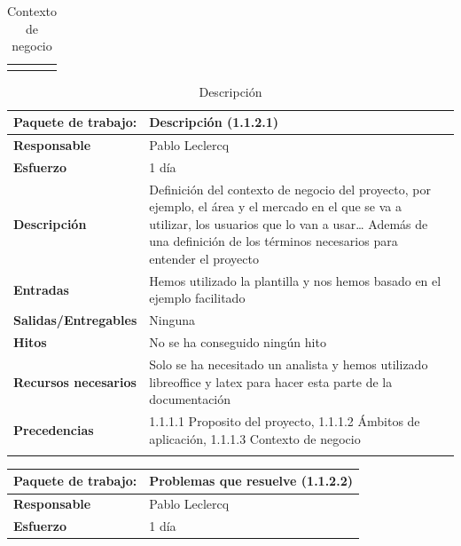 \documentclass{report}
\begin{document}
\begin{center}
\begin{longtable}{|p{6cm}|p{6cm}|}
                    \hline
                    \caption{Contexto de negocio}
                \end{longtable}
                \begin{longtable}{|p{6cm}|p{6cm}|}
                    \hline
                    \textbf{Paquete de trabajo:} & Descripción (1.1.2.1)\\
                    \hline
                    \textbf{Responsable} & Pablo Leclercq\\
                    \hline
                    \textbf{Esfuerzo} & 1 día\\
                    \hline
                    \textbf{Descripción} & Definición del contexto de negocio del proyecto, por ejemplo, el área y el mercado en el que se va a utilizar, los usuarios que lo van a usar… Además de una definición de los términos necesarios para entender el proyecto \\
                    \hline
                    \textbf{Entradas} & Hemos utilizado la plantilla y nos hemos basado en el ejemplo facilitado\\
                    \hline
                    \textbf{Salidas/Entregables} & Ninguna\\
                    \hline
                    \textbf{Hitos} & No se ha conseguido ningún hito\\
                    \hline
                    \textbf{Recursos necesarios} & Solo se ha necesitado un analista y hemos utilizado libreoffice y latex para hacer esta parte de la documentación\\
                    \hline
                    \textbf{Precedencias} & 1.1.1.1 Proposito del proyecto,
                                            1.1.1.2 Ámbitos de aplicación,
                                            1.1.1.3 Contexto de negocio\\
                    \hline
                    \caption{Descripción}
                \end{longtable}
                \clearpage
                \begin{longtable}{|p{6cm}|p{6cm}|}
                    \hline
                    \textbf{Paquete de trabajo:} & Problemas que resuelve (1.1.2.2)\\
                    \hline
                    \textbf{Responsable} & Pablo Leclercq\\
                    \hline
                    \textbf{Esfuerzo} & 1 día\\
                    \hline

\end{longtable}
\end{center}
\end{document}
